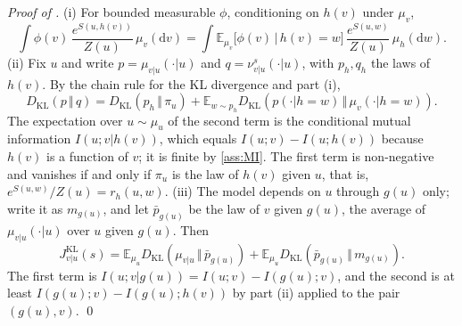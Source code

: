 \documentclass[11pt]{article}
\theoremstyle{plain}
\theoremstyle{definition}
\theoremstyle{remark}
\newcommand{\E}{\mathbb{E}}
\newcommand{\Dd}{\mathrm{d}}
\newcommand{\KL}[2]{D_{\mathrm{KL}}\!\left(#1\,\Vert\,#2\right)}
\newcommand{\Jvu}{J_{v\vert u}}
\begin{document}
\smallskip
\noindent\emph{Proof of .}
(i) For bounded measurable $\phi$, conditioning on $h(v)$ under $\mu_v$,
\begin{equation*}
 \int\phi(v)\,\frac{e^{S(u,h(v))}}{Z(u)}\,\mu_v(\Dd v)
 =\int\E_{\mu_v}\bigl[\phi(v)\,\big\vert\,h(v)=w\bigr]\,\frac{e^{S(u,w)}}{Z(u)}\,\mu_h(\Dd w).
\end{equation*}
(ii) Fix $u$ and write $p=\mu_{v\vert u}(\cdot\vert u)$ and
$q=\nu^{s}_{v\vert u}(\cdot\vert u)$, with $p_h,q_h$ the laws of $h(v)$. By
the chain rule for the KL divergence and part (i),
\begin{equation*}
 \KL{p}{q}=\KL{p_h}{\pi_u}+\E_{w\sim p_h}\KL{p(\cdot\vert h=w)}{\mu_v(\cdot\vert h=w)}.
\end{equation*}
The expectation over $u\sim\mu_u$ of the second term is the conditional
mutual information $I(u;v\vert h(v))$, which equals $I(u;v)-I(u;h(v))$
because $h(v)$ is a function of $v$; it is finite by \ref{ass:MI}. The first
term is non-negative and vanishes if and only if $\pi_u$ is the law of
$h(v)$ given $u$, that is, $e^{S(u,w)}/Z(u)=r_h(u,w)$.
(iii) The model depends on $u$ through $g(u)$ only; write it as $m_{g(u)}$,
and let $\bar p_{g(u)}$ be the law of $v$ given $g(u)$, the average of
$\mu_{v\vert u}(\cdot\vert u)$ over $u$ given $g(u)$. Then
\begin{equation*}
 \Jvu^{\mathrm{KL}}(s)=\E_{\mu_u}\KL{\mu_{v\vert u}}{\bar p_{g(u)}}+\E_{\mu_u}\KL{\bar p_{g(u)}}{m_{g(u)}}.
\end{equation*}
The first term is $I(u;v\vert g(u))=I(u;v)-I(g(u);v)$, and the second is at
least $I(g(u);v)-I(g(u);h(v))$ by part (ii) applied to the pair $(g(u),v)$.
\qed
\end{document}
